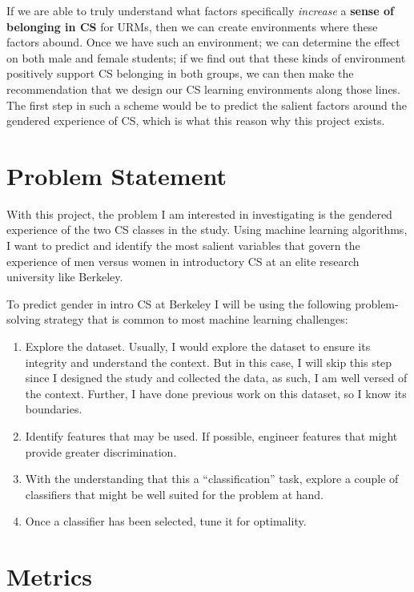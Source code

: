 If we are able to truly understand what factors specifically \emph{increase} a \textbf{sense of belonging in CS} for URMs, then we can create environments where these factors abound. Once we have such an environment; we can determine the effect on both male and female students; if we find out that these kinds of environment positively support CS belonging in both groups, we can then make the recommendation that we design our CS learning environments along those lines. The first step in such a scheme would be to predict the salient factors around the gendered experience of CS, which is what this reason why this project exists.


\section*{Problem Statement}

With this project, the problem I am interested in investigating is the gendered experience of the two CS classes in the study. Using machine learning algorithms, I want to predict and identify the most salient variables that govern the experience of men versus women in introductory CS at an elite research university like Berkeley.

To predict gender in intro CS at Berkeley I will be using the following problem-solving strategy that is common to most machine learning challenges:
\begin{enumerate}%
\item Explore the dataset. Usually, I would explore the dataset to ensure its integrity and understand the context. But in this case, I will skip this step since I designed the study and collected the data, as such, I am well versed of the context. Further, I have done previous work on this dataset, so I know its boundaries.
\item Identify features that may be used. If possible, engineer features that might provide greater discrimination.
\item With the understanding that this a ``classification'' task, explore a couple of classifiers that might be well suited for the problem at hand.
\item Once a classifier has been selected, tune it for optimality.
\end{enumerate}

\section*{Metrics}


